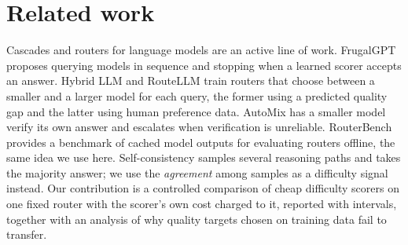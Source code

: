 \documentclass[11pt]{article}
\begin{document}
\section{Related work}
Cascades and routers for language models are an active line of work. FrugalGPT \cite{chen2023frugalgpt} proposes querying models in sequence and stopping when a learned scorer accepts an answer. Hybrid LLM \cite{ding2024hybrid} and RouteLLM \cite{ong2025routellm} train routers that choose between a smaller and a larger model for each query, the former using a predicted quality gap and the latter using human preference data. AutoMix \cite{aggarwal2024automix} has a smaller model verify its own answer and escalates when verification is unreliable. RouterBench \cite{hu2024routerbench} provides a benchmark of cached model outputs for evaluating routers offline, the same idea we use here. Self-consistency \cite{wang2023selfconsistency} samples several reasoning paths and takes the majority answer; we use the \emph{agreement} among samples as a difficulty signal instead. Our contribution is a controlled comparison of cheap difficulty scorers on one fixed router with the scorer's own cost charged to it, reported with intervals, together with an analysis of why quality targets chosen on training data fail to transfer.
\end{document}
